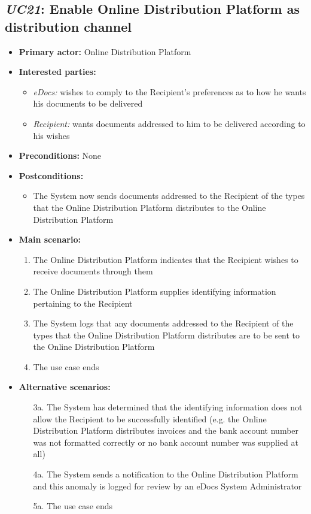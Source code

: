 \documentclass[a4paper,10pt]{article}
\begin{document}
\subsection{\emph{UC21}: Enable Online Distribution Platform as distribution channel}
\begin{itemize}
	\item \textbf{Primary actor:} Online Distribution Platform
	\item \textbf{Interested parties:} 
	\begin{itemize}
		\item \textit{eDocs:} wishes to comply to the Recipient's preferences as to how he wants his documents to be delivered
		\item \textit{Recipient:} wants documents addressed to him to be delivered according to his wishes
	\end{itemize}
	
	\item \textbf{Preconditions:}
	None
	
	\item \textbf{Postconditions:}
	\begin{itemize}
		\item The System now sends documents addressed to the Recipient of the types that the Online Distribution Platform distributes to the Online Distribution Platform
	\end{itemize}
	
	\item \textbf{Main scenario:} 
	\begin{enumerate}
		\item The Online Distribution Platform indicates that the Recipient wishes to receive documents through them
		\item The Online Distribution Platform supplies identifying information pertaining to the Recipient
		\item The System logs that any documents addressed to the Recipient of the types that the Online Distribution Platform distributes are to be sent to the Online Distribution Platform
		\item The use case ends
	\end{enumerate}
	
	\item \textbf{Alternative scenarios:} 
	\begin{enumerate}
		\item [3a.] The System has determined that the identifying information does not allow the Recipient to be successfully identified (e.g. the Online Distribution Platform distributes invoices and the bank account number was not formatted correctly or no bank account number was supplied at all)
		\item [4a.] The System sends a notification to the Online Distribution Platform and this anomaly is logged for review by an eDocs System Administrator
		\item [5a.] The use case ends
	\end{enumerate}
	

\end{itemize}
\end{document}

